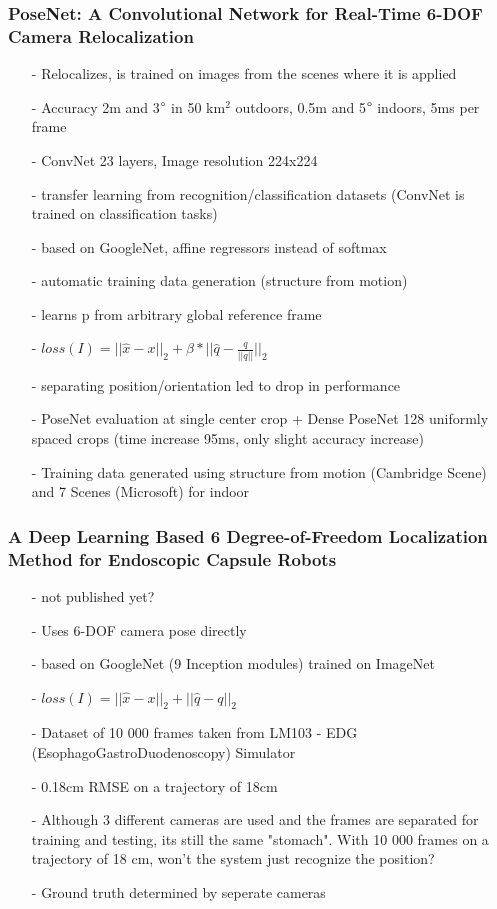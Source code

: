 \documentclass{article}
\begin{document}
\begin{multicols}{2}
	\subsubsection{PoseNet: A Convolutional Network for Real-Time 6-DOF Camera Relocalization \cite{Kendall}}
	\begin{itemize}
			\item[-] Relocalizes, is trained on images from the scenes where it is applied	\item[-] Accuracy 2m and 3$\degree$  in 50 km$^2$ outdoors, 0.5m and 5$\degree$ indoors, 5ms per frame
		\item[-] ConvNet 23 layers, Image resolution 224x224
		\item[-] transfer learning from recognition/classification datasets (ConvNet is trained on classification tasks)
		\item[-] based on GoogleNet, affine regressors instead of softmax\item[-] automatic training data generation (structure from motion)
		\item[-] learns p from arbitrary global reference frame
		\item[-] $loss(I) = || \hat{x}-x||_2 + \beta*||\hat{q}-\frac{q}{||q||}||_2$
		\item[-] separating position/orientation led to drop in performance
		\item[-] PoseNet evaluation at single center crop + Dense PoseNet 128 uniformly spaced crops (time increase 95ms, only slight accuracy increase)
		\item[-] Training data generated using structure from motion (Cambridge Scene) and 7 Scenes (Microsoft) for indoor

	\end{itemize}
	 \subsubsection{A Deep Learning Based 6 Degree-of-Freedom
	 	Localization Method for Endoscopic Capsule Robots \cite{Turan2017}}
	 	\begin{itemize}
	 		\item[-] not published yet?
	 		\item[-] Uses 6-DOF camera pose directly
	 		\item[-] based on GoogleNet (9 Inception modules) trained on ImageNet
	 		\item[-] $loss(I) = ||\hat{x}-x||_2 + ||\hat{q}-q||_2$
	 		\item[-] Dataset of 10 000 frames taken from LM103 - EDG (EsophagoGastroDuodenoscopy) Simulator
	 		\item[-] 0.18cm RMSE on a trajectory of 18cm
	 		\item[-] Although 3 different cameras are used and the frames are separated for training and testing, its still the same "stomach". With 10 000 frames on a trajectory of 18 cm, won't the system just recognize the position?
	 		\item[-] Ground truth determined by seperate cameras 
	 	\end{itemize}

\end{multicols}
\end{document}
